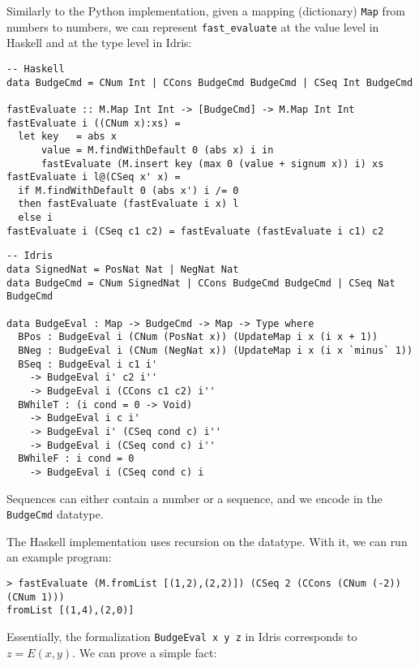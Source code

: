 \documentclass{article}
\begin{document}
\pagebreak

Similarly to the Python implementation, given a mapping (dictionary) \texttt{Map} from numbers to numbers, we can represent \texttt{fast\_evaluate} at the value level in Haskell and at the type level in Idris:

\begin{minipage}[t]{0.49\textwidth}
\begin{lstlisting}
-- Haskell
data BudgeCmd = CNum Int | CCons BudgeCmd BudgeCmd | CSeq Int BudgeCmd

fastEvaluate :: M.Map Int Int -> [BudgeCmd] -> M.Map Int Int
fastEvaluate i ((CNum x):xs) =
  let key   = abs x
      value = M.findWithDefault 0 (abs x) i in
      fastEvaluate (M.insert key (max 0 (value + signum x)) i) xs
fastEvaluate i l@(CSeq x' x) =
  if M.findWithDefault 0 (abs x') i /= 0
  then fastEvaluate (fastEvaluate i x) l
  else i
fastEvaluate i (CSeq c1 c2) = fastEvaluate (fastEvaluate i c1) c2
\end{lstlisting}
\end{minipage}
\begin{minipage}[t]{0.49\textwidth}
\begin{lstlisting}
-- Idris
data SignedNat = PosNat Nat | NegNat Nat
data BudgeCmd = CNum SignedNat | CCons BudgeCmd BudgeCmd | CSeq Nat BudgeCmd

data BudgeEval : Map -> BudgeCmd -> Map -> Type where
  BPos : BudgeEval i (CNum (PosNat x)) (UpdateMap i x (i x + 1))
  BNeg : BudgeEval i (CNum (NegNat x)) (UpdateMap i x (i x `minus` 1))
  BSeq : BudgeEval i c1 i'
    -> BudgeEval i' c2 i''
    -> BudgeEval i (CCons c1 c2) i''
  BWhileT : (i cond = 0 -> Void)
    -> BudgeEval i c i'
    -> BudgeEval i' (CSeq cond c) i''
    -> BudgeEval i (CSeq cond c) i''
  BWhileF : i cond = 0
    -> BudgeEval i (CSeq cond c) i
\end{lstlisting}
\end{minipage}

Sequences can either contain a number or a sequence, and we encode in the \texttt{BudgeCmd} datatype.

The Haskell implementation uses recursion on the datatype. With it, we can run an example program:

\begin{verbatim}
> fastEvaluate (M.fromList [(1,2),(2,2)]) (CSeq 2 (CCons (CNum (-2)) (CNum 1)))
fromList [(1,4),(2,0)]
\end{verbatim}

Essentially, the formalization \texttt{BudgeEval x y z} in Idris corresponds to $z = E(x, y)$. We can prove a simple fact:
\end{document}
